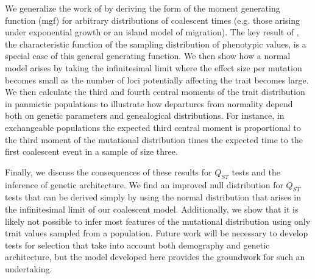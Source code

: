 We generalize the work of \citet{Schraiber2015} by deriving the form of the
moment generating function (mgf) for arbitrary distributions of coalescent times
(e.g. those arising under exponential growth or an island model of migration).
The key result of \citet{Schraiber2015}, the characteristic function of the
sampling distribution of phenotypic values, is a special case of this general
generating function. We then show how a normal model arises by taking the
infinitesimal limit where the effect size per mutation becomes small as the
number of loci potentially affecting the trait becomes large. We then calculate
the third and fourth central moments of the trait distribution in panmictic
populations to illustrate how departures from normality depend both on genetic
parameters and genealogical distributions. For instance, in exchangeable
populations the expected third central moment is proportional to the third
moment of the mutational distribution times the expected time to the first
coalescent event in a sample of size three.

Finally, we discuss the consequences of these results for $Q_{ST}$ tests and the
inference of genetic architecture. We find an improved null distribution for
$Q_{ST}$ tests that can be derived simply by using the normal distribution that
arises in the infinitesimal limit of our coalescent model. Additionally, we show
that it is likely not possible to infer most features of the mutational
distribution using only trait values sampled from a population. Future work will
be necessary to develop tests for selection that take into account both
demography and genetic architecture, but the model developed here provides the
groundwork for such an undertaking.

